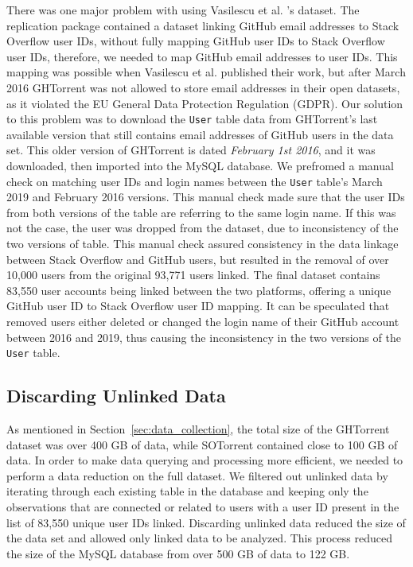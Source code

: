         There was one major problem with using Vasilescu et al. \cite{vasilescu2013stackoverflow}'s dataset. The replication package contained a dataset linking GitHub email addresses to Stack Overflow user IDs, without fully mapping GitHub user IDs to Stack Overflow user IDs, therefore, we needed to map GitHub email addresses to user IDs. This mapping was possible when Vasilescu et al. \cite{vasilescu2013stackoverflow} published their work, but after March 2016 GHTorrent was not allowed to store email addresses in their open datasets, as it violated the EU General Data Protection Regulation (GDPR). Our solution to this problem was to download the \texttt{User} table data from GHTorrent's last available version that still contains email addresses of GitHub users in the data set. This older version of GHTorrent is dated \textit{February 1st 2016}, and it was downloaded, then imported into the MySQL database. We prefromed a manual check on matching user IDs and login names between the \texttt{User} table's March 2019 and February 2016 versions. This manual check made sure that the user IDs from both versions of the table are referring to the same login name. If this was not the case, the user was dropped from the dataset, due to inconsistency of the two versions of table. This manual check assured consistency in the data linkage between Stack Overflow and GitHub users, but resulted in the removal of over 10,000 users from the original 93,771 users linked. The final dataset contains 83,550 user accounts being linked between the two platforms, offering a unique GitHub user ID to Stack Overflow user ID mapping. It can be speculated that removed users either deleted or changed the login name of their GitHub account between 2016 and 2019, thus causing the inconsistency in the two versions of the \texttt{User} table.
        
    \subsection{Discarding Unlinked Data}
    
       As mentioned in Section~\ref{sec:data_collection}, the total size of the GHTorrent dataset was over 400 GB of data, while SOTorrent contained close to 100 GB of data. In order to make data querying and processing more efficient, we needed to perform a data reduction on the full dataset. 
       We filtered out unlinked data by iterating through each existing table in the database and keeping only the observations that are connected or related to users with a user ID present in the list of 83,550 unique user IDs linked. Discarding unlinked data reduced the size of the data set and allowed only linked data to be analyzed. This process reduced the size of the MySQL database from over 500 GB of data to 122 GB.
        
